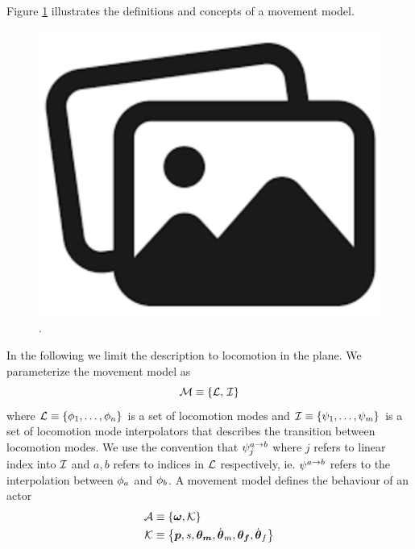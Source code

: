 Figure \ref{fig:movement:model} illustrates the definitions and concepts of a movement model.
\begin{figure}
    \centering
    \includegraphics[width=0.75\columnwidth]{img/temporary.png}
    \caption{.}
    \label{fig:movement:model}
\end{figure}
In the following we limit  the description to locomotion in the plane. We parameterize the movement model as 
\begin{equation}
    \label{eq:model:parameterization}
 \mathcal{M} \equiv 
 \left\{ \mathcal{L},\,\mathcal{I} \right\}
\end{equation}
where $\mathcal{L} \equiv \left\{  \phi_1, \ldots, \phi_n \right\}$ is a set of locomotion modes and $\mathcal{I} \equiv \left\{  \psi_1, \ldots, \psi_m \right\}$ is a set of locomotion mode interpolators that describes the transition between locomotion modes. We use the convention that $\psi_j^{a\rightarrow b}$ where $j$ refers to linear index into $\mathcal{I}$ and $a,b$ refers to indices in $\mathcal{L}$ respectively, ie. $\psi^{a\rightarrow b}$ refers to the interpolation between $\phi_a$ and $\phi_b$. A movement model defines the behaviour of an actor 
\begin{subequations}
\begin{align}
    \label{eq:actor:def}
    \mathcal{A} 
    &\equiv
    \left\{ 
        \boldsymbol{\omega }, \mathcal{K} 
         \right\}\\
    \mathcal{K}
    &\equiv
    \left\{ 
        \boldsymbol{p }, s, \boldsymbol{\theta_m }, \dot{\boldsymbol{\theta }}_m, {\boldsymbol{\theta_f }}, \dot{\boldsymbol{\theta }}_f 
         \right\}
\end{align}
\end{subequations}
